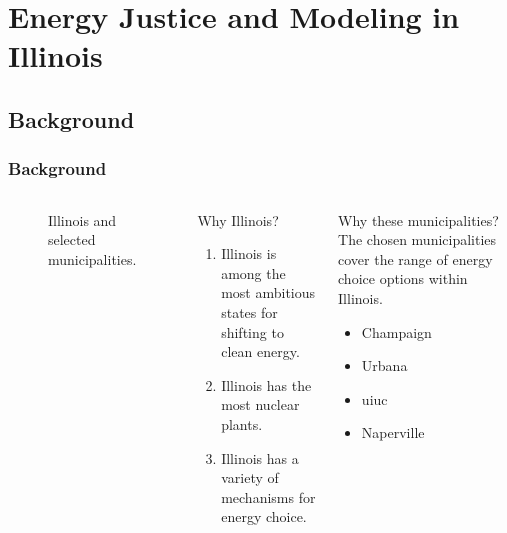 \section{Energy Justice and Modeling in Illinois}

\subsection{Background}


\begin{frame}
    \frametitle{Background}
        
    \begin{columns}
        \column[t]{2.5cm}
        \begin{figure}
            \centering
            \resizebox{\columnwidth}{!}{}
            \caption{Illinois and selected municipalities.}
            \label{fig:illinois}
        \end{figure}
        \column[t]{7.5cm}
        \begin{block}{Why Illinois?}
            \begin{enumerate}[<+->]
                \item Illinois is among the most ambitious states for shifting
                to clean energy.
                \item Illinois has the most nuclear plants.
                \item Illinois has a variety of mechanisms for energy choice.
            \end{enumerate}
        \end{block}
        \begin{block}{Why these municipalities?}
            The chosen municipalities cover the range of energy choice options
            within Illinois.
            \begin{itemize}[<+->]
                \item Champaign
                \item Urbana
                \item \gls{uiuc}
                \item Naperville
            \end{itemize}
        \end{block}
    \end{columns}
\end{frame}


